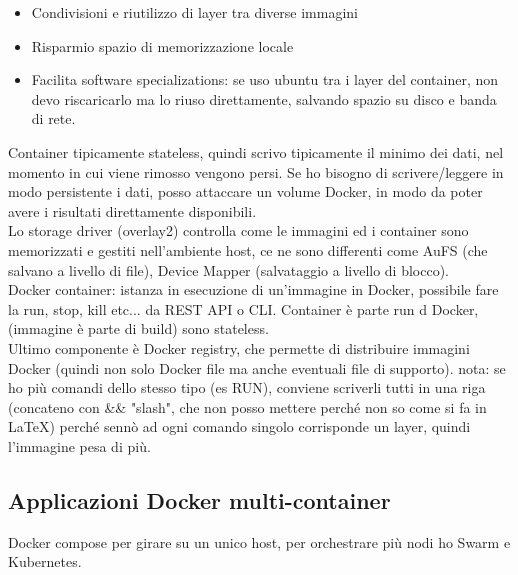 \documentclass[16px]{article}
\begin{document}
\begin{itemize}
\item Condivisioni e riutilizzo di layer tra diverse immagini
\item Risparmio spazio di memorizzazione locale
\item Facilita software specializations: se uso ubuntu tra i layer del container, non devo riscaricarlo ma lo riuso direttamente,  salvando spazio su disco e banda di rete.
\end{itemize}
Container tipicamente stateless, quindi scrivo tipicamente il minimo dei dati, nel momento in cui viene rimosso vengono persi. Se ho bisogno di scrivere/leggere in modo persistente i dati, posso attaccare un volume Docker, in modo da poter avere i risultati direttamente disponibili.\\ Lo storage driver (overlay2) controlla come le immagini ed i container sono memorizzati e gestiti nell'ambiente host, ce ne sono differenti come AuFS (che salvano a livello di file), Device Mapper (salvataggio a livello di blocco).\\ Docker container: istanza in esecuzione di un'immagine in Docker, possibile fare la run, stop, kill etc... da REST API o CLI. Container è parte run d Docker, (immagine è parte di build) sono stateless.\\ Ultimo componente è Docker registry, che permette di distribuire immagini Docker (quindi non solo Docker file ma anche eventuali file di supporto).
nota: se ho più comandi dello stesso tipo (es RUN), conviene scriverli tutti in una riga (concateno con \&\& "slash", che non posso mettere perché non so come si fa in LaTeX) perché sennò ad ogni comando singolo corrisponde un layer, quindi l'immagine pesa di più.
\subsection{Applicazioni Docker multi-container}
Docker compose per girare su un unico host, per orchestrare più nodi ho Swarm e Kubernetes.
\end{document}
